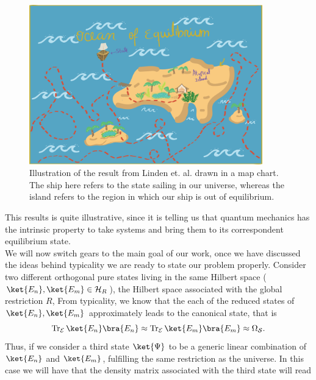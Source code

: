 \begin{figure}[h!]
\centering
\includegraphics[width=0.9\textwidth]{Figures/ocean-of-equilibrium.png}
\caption{Illustration of the result from Linden et. al. drawn in a map chart. The ship here refers to the state sailing in our universe, whereas the island refers to the region in which our ship is out of equilibrium.}
\label{Island_of_equilibrium}
\end{figure}
\indent This results is quite illustrative, since it is telling us that quantum mechanics has the intrinsic property to take systems and bring them to its correspondent equilibrium state.\\


\indent We will now switch gears to the main goal of our work, once we have discussed the ideas behind typicality we are ready to state our problem properly. Consider two different orthogonal pure states living in the same Hilbert space ($\ket{E_n},\ket{E_m} \in \mathcal{H}_{R}$), the Hilbert space associated with the global restriction $R$, From typicality, we know that the each of the reduced states of $\ket{E_n},\ket{E_m}$ approximately leads to the canonical state, that is
\begin{equation}
\operatorname{Tr}_{\mathcal{E}} \ket{E_n}\bra{E_n} \approx \operatorname{Tr}_{\mathcal{E}} \ket{E_m}\bra{E_m} \approx \Omega_{\mathcal{S}}.
\end{equation}
Thus, if we consider a third state $\ket{\Psi}$ to be a generic linear combination of $\ket{E_n}$ and $\ket{E_m}$, fulfilling the same restriction as the universe. In this case we will have that the density matrix associated with the third state will read

